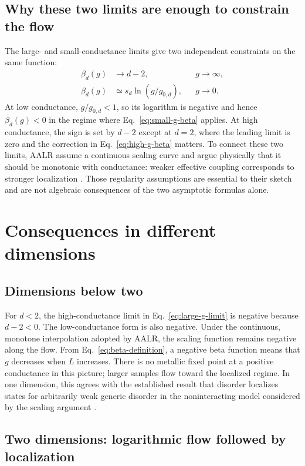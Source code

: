 \documentclass[11pt,a4paper]{article}
\numberwithin{equation}{section}
\begin{document}
\subsection{Why these two limits are enough to constrain the flow}

The large- and small-conductance limits give two independent constraints on the same function:
\begin{align}
    \beta_d(g)&\longrightarrow d-2,
        &&g\to\infty,\\
    \beta_d(g)&\simeq s_d\ln(g/g_{0,d}),
        &&g\to0.
\end{align}
At low conductance, $g/g_{0,d}<1$, so its logarithm is negative and hence $\beta_d(g)<0$ in the regime where Eq.~\eqref{eq:small-g-beta} applies. At high conductance, the sign is set by $d-2$ except at $d=2$, where the leading limit is zero and the correction in Eq.~\eqref{eq:high-g-beta} matters. To connect these two limits, AALR assume a continuous scaling curve and argue physically that it should be monotonic with conductance: weaker effective coupling corresponds to stronger localization \cite{AALR1979}. Those regularity assumptions are essential to their sketch and are not algebraic consequences of the two asymptotic formulas alone.

\section{Consequences in different dimensions}

\subsection{Dimensions below two}

For $d<2$, the high-conductance limit in Eq.~\eqref{eq:large-g-limit} is negative because $d-2<0$. The low-conductance form is also negative. Under the continuous, monotone interpolation adopted by AALR, the scaling function remains negative along the flow. From Eq.~\eqref{eq:beta-definition}, a negative beta function means that $g$ decreases when $L$ increases. There is no metallic fixed point at a positive conductance in this picture; larger samples flow toward the localized regime. In one dimension, this agrees with the established result that disorder localizes states for arbitrarily weak generic disorder in the noninteracting model considered by the scaling argument \cite{Thouless1974,LeeRamakrishnan1985}.

\subsection{Two dimensions: logarithmic flow followed by localization}
\end{document}
